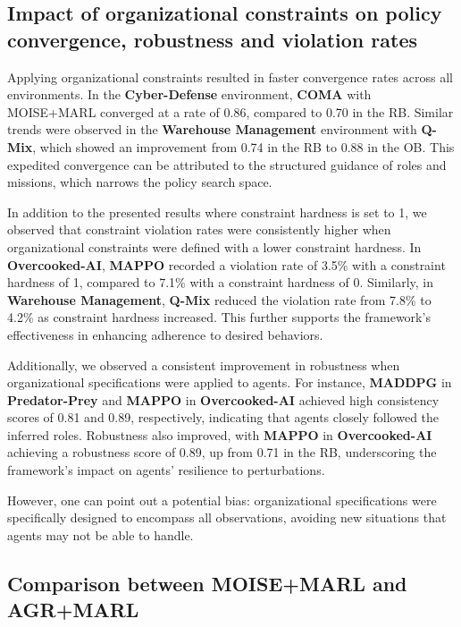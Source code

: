 \documentclass[sigconf,anonymous]{aamas}
\begin{document}
\subsection{Impact of organizational constraints on policy convergence, robustness and violation rates}

Applying organizational constraints resulted in faster convergence rates across all environments. In the \textbf{Cyber-Defense} environment, \textbf{COMA} with MOISE+MARL converged at a rate of 0.86, compared to 0.70 in the RB. Similar trends were observed in the \textbf{Warehouse Management} environment with \textbf{Q-Mix}, which showed an improvement from 0.74 in the RB to 0.88 in the OB. This expedited convergence can be attributed to the structured guidance of roles and missions, which narrows the policy search space.

In addition to the presented results where constraint hardness is set to 1, we observed that constraint violation rates were consistently higher when organizational constraints were defined with a lower constraint hardness. In \textbf{Overcooked-AI}, \textbf{MAPPO} recorded a violation rate of 3.5\% with a constraint hardness of 1, compared to 7.1\% with a constraint hardness of 0. Similarly, in \textbf{Warehouse Management}, \textbf{Q-Mix} reduced the violation rate from 7.8\% to 4.2\% as constraint hardness increased. This further supports the framework's effectiveness in enhancing adherence to desired behaviors.

Additionally, we observed a consistent improvement in robustness when organizational specifications were applied to agents. For instance, \textbf{MADDPG} in \textbf{Predator-Prey} and \textbf{MAPPO} in \textbf{Overcooked-AI} achieved high consistency scores of 0.81 and 0.89, respectively, indicating that agents closely followed the inferred roles. Robustness also improved, with \textbf{MAPPO} in \textbf{Overcooked-AI} achieving a robustness score of 0.89, up from 0.71 in the RB, underscoring the framework's impact on agents' resilience to perturbations.

However, one can point out a potential bias: organizational specifications were specifically designed to encompass all observations, avoiding new situations that agents may not be able to handle.


\subsection{Comparison between MOISE+MARL and AGR+MARL}
\end{document}
